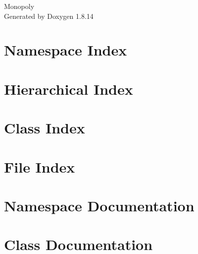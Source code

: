 \documentclass[twoside]{book}
\newcommand{\+}{\discretionary{\mbox{\scriptsize$\hookleftarrow$}}{}{}}
\newcommand{\clearemptydoublepage}{%
  \newpage{\pagestyle{empty}\cleardoublepage}%
}
\begin{document}
\hypersetup{pageanchor=false,
             bookmarksnumbered=true,
             pdfencoding=unicode
            }
\begin{titlepage}
\vspace*{7cm}
\begin{center}%
{\Large Monopoly }\\
\vspace*{1cm}
{\large Generated by Doxygen 1.8.14}\\
\end{center}
\end{titlepage}
\clearemptydoublepage
{}
\tableofcontents
\clearemptydoublepage
{}
\hypersetup{pageanchor=true}

\chapter{Namespace Index}

\chapter{Hierarchical Index}

\chapter{Class Index}

\chapter{File Index}

\chapter{Namespace Documentation}








\chapter{Class Documentation}























\end{document}
